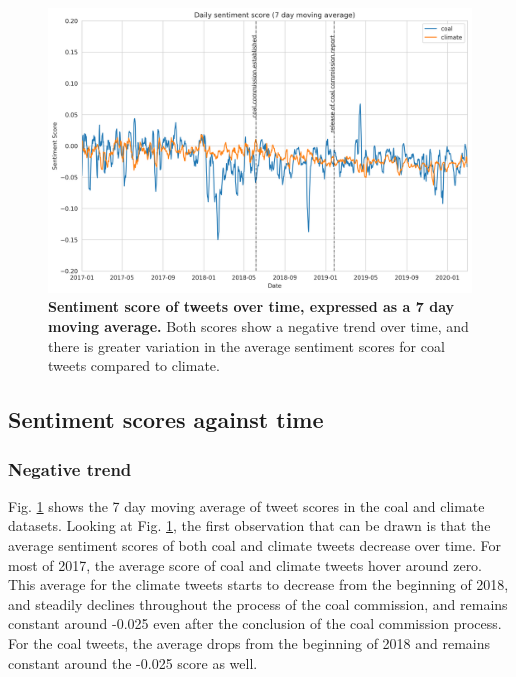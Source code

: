 \documentclass[12pt,onecolumn,twoside]{layout}
\begin{document}
\begin{figure} 
	\begin{center}
		\includegraphics[width=\linewidth]{figures/sa_dailyavgsenti_7dma_baseline2}
	\end{center}
	\caption{\textbf{Sentiment score of tweets over time, expressed as a 7 day moving average.} Both scores show a negative trend over time, and there is greater variation in the average sentiment scores for coal tweets compared to climate.}
	\label{fig:tweet_score}
\end{figure}

\subsection*{Sentiment scores against time} 
\subsubsection*{Negative trend} %
Fig. \ref{fig:tweet_score} shows the 7 day moving average of tweet scores in the coal and climate datasets. Looking at Fig. \ref{fig:tweet_score}, the first observation that can be drawn is that the average sentiment scores of both coal and climate tweets decrease over time. For most of 2017, the average score of coal and climate tweets hover around zero. This average for the climate tweets starts to decrease from the beginning of 2018, and steadily declines throughout the process of the coal commission, and remains constant around -0.025 even after the conclusion of the coal commission process. For the coal tweets, the average drops from the beginning of 2018 and remains constant around the -0.025 score as well. 
\end{document}
